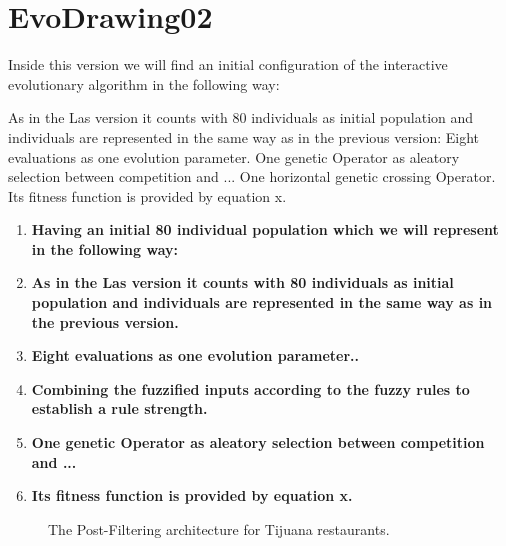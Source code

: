 \section{EvoDrawing02}

Inside this version we will find an initial configuration of the interactive evolutionary algorithm in the following way:

As in the Las version it counts with 80 individuals as initial population and individuals are represented in the same way as in the previous version:
Eight evaluations as one evolution parameter.
One genetic Operator as aleatory selection between competition and ...      
One horizontal genetic crossing Operator.
Its fitness function is provided by equation x.

\begin{enumerate}
	\item  \textbf{Having an initial 80 individual population which we will represent in the following way:}
	
	
	
	\item  \textbf{As in the Las version it counts with 80 individuals as initial population and individuals are represented in the same way as in the previous version.}
	
	\item  \textbf{Eight evaluations as one evolution parameter..} 
	\item  \textbf{Combining the fuzzified inputs according to the fuzzy rules to establish a rule strength.} 
	\item  \textbf{One genetic Operator as aleatory selection between competition and ...}
	\item  \textbf{Its fitness function is provided by equation x.}
\end{enumerate}

\begin{figure}
	\centering
	\setlength\fboxsep{0pt}
	\caption{The Post-Filtering architecture for Tijuana restaurants.}
	\label{fig:postfiltering}     
\end{figure}



